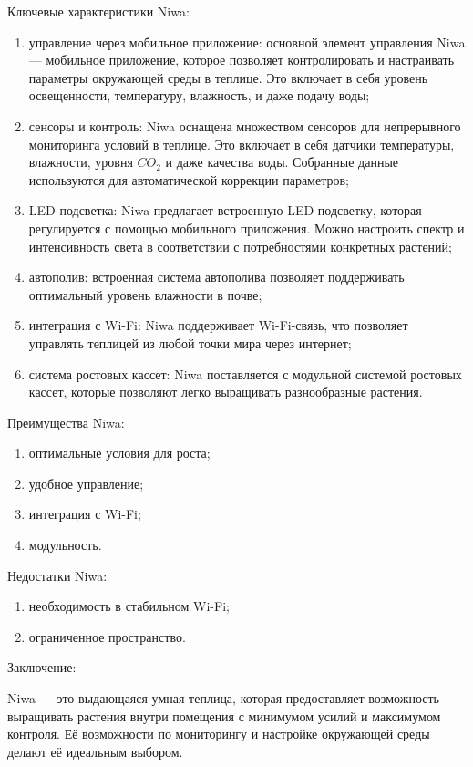 Ключевые характеристики Niwa:

\begin{enumerate}
    \item управление через мобильное приложение: основной элемент управления Niwa --- мобильное приложение, которое позволяет контролировать и настраивать параметры окружающей среды в теплице. Это включает в себя уровень освещенности, температуру, влажность, и даже подачу воды;
    \item сенсоры и контроль: Niwa оснащена множеством сенсоров для непрерывного мониторинга условий в теплице. Это включает в себя датчики температуры, влажности, уровня $CO_2$ и даже качества воды. Собранные данные используются для автоматической коррекции параметров;
    \item LED-подсветка: Niwa предлагает встроенную LED-подсветку, которая регулируется с помощью мобильного приложения. Можно настроить спектр и интенсивность света в соответствии с потребностями конкретных растений;
    \item автополив: встроенная система автополива позволяет поддерживать оптимальный уровень влажности в почве;
    \item интеграция с Wi-Fi: Niwa поддерживает Wi-Fi-связь, что позволяет управлять теплицей из любой точки мира через интернет;
    \item система ростовых кассет: Niwa поставляется с модульной системой ростовых кассет, которые позволяют легко выращивать разнообразные растения.
\end{enumerate}

Преимущества Niwa:

\begin{enumerate}
    \item оптимальные условия для роста;
    \item удобное управление;
    \item интеграция с Wi-Fi;
    \item модульность.
\end{enumerate}

Недостатки Niwa:

\begin{enumerate}
    \item необходимость в стабильном Wi-Fi;
    \item ограниченное пространство.
\end{enumerate}

Заключение:

Niwa --- это выдающаяся умная теплица, которая предоставляет возможность выращивать растения внутри помещения с минимумом усилий и максимумом контроля. Её возможности по мониторингу и настройке окружающей среды делают её идеальным выбором.


